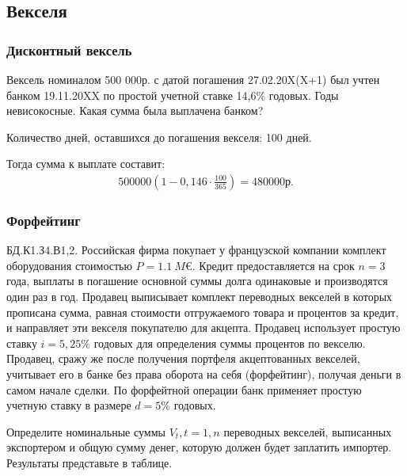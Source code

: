 \documentclass[12pt, table, a4paper,twoside]{exam}
\begin{document}
\begin{questions}
\begin{subparts}
\end{subparts}
\addpoints

\subsection{Векселя}
\subsubsection{Дисконтный вексель}
\question[10] Вексель номиналом 500 000р. с датой погашения 27.02.20X(X+1) был учтен банком 19.11.20XX по простой учетной ставке 14,6\% годовых. Годы невисокосные. Какая сумма была выплачена банком?

\begin{solution}[12em]
	
	\raggedright
	Количество дней, оставшихся до погашения векселя: 100 дней.
	
	Тогда сумма к выплате составит:
	\begin{align*}
	500000 (1- 0,146 \cdot \frac{100}{365}) = 480 000\text{р.}
	\end{align*}
\end{solution}


\subsubsection{Форфейтинг}
\question[20] БД.К1.З4.В1,2. Российская фирма покупает у французской компании комплект оборудования стоимостью $P=1.1~M€$. Кредит предоставляется на срок $n=3$ года, выплаты в погашение основной суммы долга одинаковые и производятся один раз в год.
Продавец выписывает комплект переводных векселей в которых прописана сумма, равная стоимости отгружаемого товара и процентов за кредит, и направляет эти векселя покупателю для акцепта. Продавец использует простую ставку $i=5,25\%$ годовых для определения суммы процентов по векселю. 
Продавец, сражу же после получения портфеля акцептованных векселей, учитывает его в банке без права оборота на себя (форфейтинг), получая деньги в самом начале сделки. По форфейтной операции банк применяет простую учетную ставку в размере $d=5\%$ годовых.

\noaddpoints

\begin{subparts}
	\subpart[5] Определите номинальные суммы $V_t, t=1,n$ переводных векселей, выписанных экспортером и общую сумму денег, которую должен будет заплатить импортер. Результаты представьте в таблице.
	

\end{subparts}
\end{questions}
\end{document}

